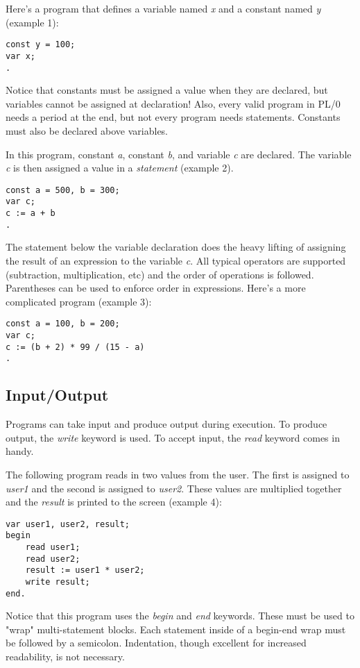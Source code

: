 \documentclass[12pt]{memoir}
\begin{document}
Here's a program that defines a variable named \emph{x} and a constant named \emph{y}
(example 1):
\begin{lstlisting}
const y = 100;
var x;
.
\end{lstlisting}
Notice that constants must be assigned a value when they are declared, but variables cannot
be assigned at declaration! Also, every valid program in PL/0 needs a period at the end, but
not every program needs statements. Constants must also be declared above variables.

In this program, constant \emph{a}, constant \emph{b}, and variable \emph{c} are declared.
The variable \emph{c} is then assigned a value in a \emph{statement} (example 2).
\begin{lstlisting}
const a = 500, b = 300;
var c;
c := a + b
.
\end{lstlisting}
The statement below the variable declaration does the heavy lifting of assigning the
result of an expression to the variable \emph{c}. All typical operators are supported
(subtraction, multiplication, etc) and the order of operations is followed. Parentheses
can be used to enforce order in expressions. Here's a more complicated program (example 3):
\begin{lstlisting}
const a = 100, b = 200;
var c;
c := (b + 2) * 99 / (15 - a)
.
\end{lstlisting}

\subsection*{Input/Output}
Programs can take input and produce output during execution. To produce output, the
\emph{write} keyword is used. To accept input, the \emph{read} keyword comes in handy.

The following program reads in two values from the user. The first is assigned to \emph{user1}
and the second is assigned to \emph{user2}. These values are multiplied together and
the \emph{result} is printed to the screen (example 4):
\begin{lstlisting}
var user1, user2, result;
begin
    read user1;
    read user2;
    result := user1 * user2;
    write result;
end.
\end{lstlisting}
Notice that this program uses the \emph{begin} and \emph{end} keywords. These must be used
to "wrap" multi-statement blocks. Each statement inside of a begin-end wrap must be followed
by a semicolon. Indentation, though excellent for increased readability, is not necessary.
\end{document}
